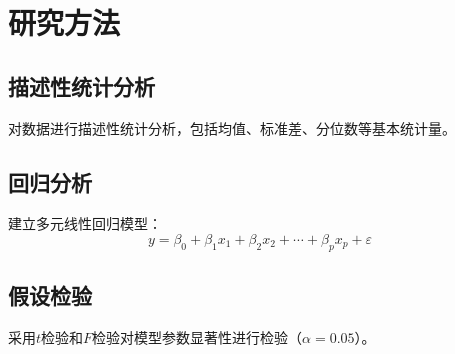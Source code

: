 \section{研究方法}


\subsection{描述性统计分析}
对数据进行描述性统计分析，包括均值、标准差、分位数等基本统计量。

\subsection{回归分析}
建立多元线性回归模型：
\begin{equation}
y = \beta_0 + \beta_1 x_1 + \beta_2 x_2 + \cdots + \beta_p x_p + \varepsilon
\end{equation}

\subsection{假设检验}
采用$t$检验和$F$检验对模型参数显著性进行检验（$\alpha = 0.05$）。
